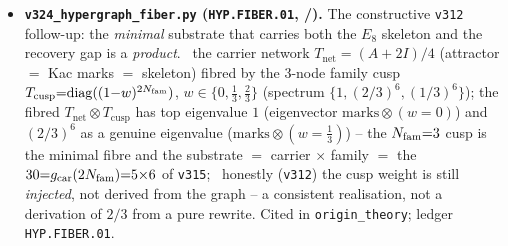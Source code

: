 \begin{itemize}
  honest step via Bisognano--Wichmann. \mE\ the $\mu_4$ clock is a geometric rotation
  $\rho{=}\mathrm{diag}(i^n){=}\exp(i\tfrac\pi2 L)$, $\mu_4\subset U(1)_{\mathrm{rot}}$; \mE\ for a rotation-covariant
  covariance $C{=}f(L)$ the modular Hamiltonian $K{=}\log((1{-}C)/C){=}g(L)$, so $[K,L]{=}0$ (the modular flow is
  geometric) and the clock is a modular symmetry \emph{for free} (the discriminator: a period-$4$ curvature preserves
  the clock but its flow is not geometric, $[K,L]\ne0$); \mC\ given the seam is the $(E_8)_1$ chiral net
  (\texttt{v308}), BW/Hislop--Longo make the vacuum modular flow geometric, so \texttt{QGEO.SYM.01}
  ($\omega\circ\rho{=}\omega$) is \emph{downstream} of \texttt{SEAM.EQUIV.01} $+$ a rotation-invariant vacuum, not an
  independent axiom; \mO\ residual: the raw collar vacuum is rotation-invariant (cleaner than \texttt{v309}, shared
  with \texttt{v308}). Cited in \texttt{origin\_theory}; ledger \texttt{QGEO.BW.01}.
\item \textbf{\texttt{v324\_hypergraph\_fiber.py} (\texttt{HYP.FIBER.01}, \mE/\mC).} The constructive \texttt{v312}
  follow-up: the \emph{minimal} substrate that carries both the $E_8$ skeleton and the recovery gap is a
  \emph{product}. \mE\ the carrier network $T_{\mathrm{net}}{=}(A{+}2I)/4$ (attractor $=$ Kac marks $=$ skeleton)
  fibred by the $3$-node family cusp $T_{\mathrm{cusp}}{=}\mathrm{diag}((1{-}w)^{2N_{\mathrm{fam}}})$, $w\in\{0,\tfrac13,\tfrac23\}$
  (spectrum $\{1,(2/3)^6,(1/3)^6\}$); the fibred $T_{\mathrm{net}}\otimes T_{\mathrm{cusp}}$ has top eigenvalue $1$
  (eigenvector $\mathrm{marks}\otimes(w{=}0)$) and $(2/3)^6$ as a genuine eigenvalue ($\mathrm{marks}\otimes(w{=}\tfrac13)$)
  -- the $N_{\mathrm{fam}}{=}3$ cusp is the minimal fibre and the substrate $=$ carrier $\times$ family $=$ the
  $30{=}g_{\mathrm{car}}(2N_{\mathrm{fam}}){=}5{\times}6$ of \texttt{v315}; \mC\ honestly (\texttt{v312}) the cusp weight is still
  \emph{injected}, not derived from the graph -- a consistent realisation, not a derivation of $2/3$ from a pure
  rewrite. Cited in \texttt{origin\_theory}; ledger \texttt{HYP.FIBER.01}.
\end{itemize}

